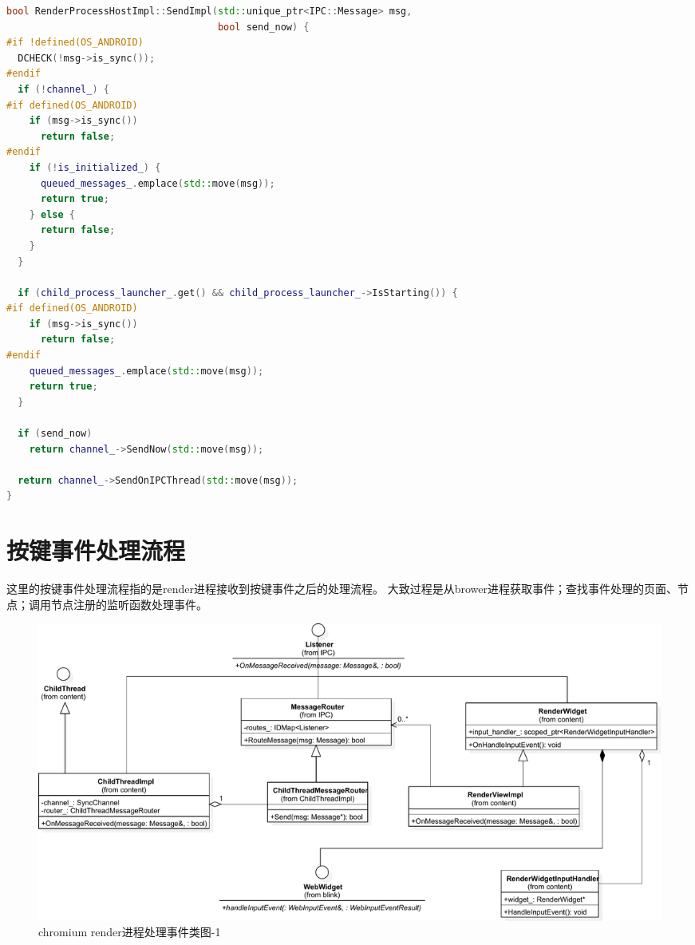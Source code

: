 \documentclass[12pt]{article}
\begin{document}
\begin{spacing}{1.0}
\begin{lstlisting}[language={C++}]
bool RenderProcessHostImpl::SendImpl(std::unique_ptr<IPC::Message> msg,
                                     bool send_now) {
#if !defined(OS_ANDROID)
  DCHECK(!msg->is_sync());
#endif
  if (!channel_) {
#if defined(OS_ANDROID)
    if (msg->is_sync())
      return false;
#endif
    if (!is_initialized_) {
      queued_messages_.emplace(std::move(msg));
      return true;
    } else {
      return false;
    }
  }

  if (child_process_launcher_.get() && child_process_launcher_->IsStarting()) {
#if defined(OS_ANDROID)
    if (msg->is_sync())
      return false;
#endif
    queued_messages_.emplace(std::move(msg));
    return true;
  }

  if (send_now)
    return channel_->SendNow(std::move(msg));

  return channel_->SendOnIPCThread(std::move(msg));
}
\end{lstlisting}
\end{spacing}


\section{按键事件处理流程}
这里的按键事件处理流程指的是render进程接收到按键事件之后的处理流程。
大致过程是从brower进程获取事件；查找事件处理的页面、节点；调用节点注册的监听函数处理事件。


\begin{figure}[H] 
  \centering 
  \includegraphics[width=\textwidth]{image/render_event_dispatch_class.pdf} 
  \caption{chromium render进程处理事件类图-1} \label{fig:render_event_dispatch_class} 
\end{figure}
\end{document}

